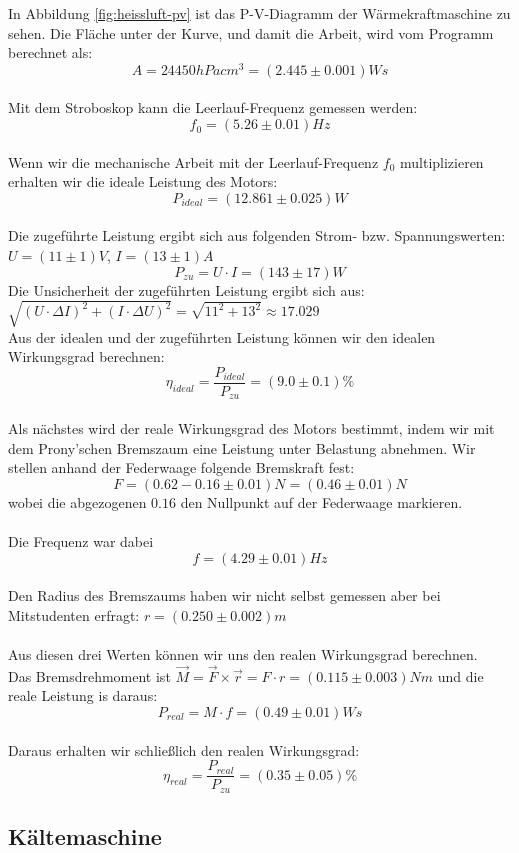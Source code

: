 \documentclass[12pt,a4paper,twopage]{article}
\begin{document}
In Abbildung \ref{fig:heissluft-pv} ist das P-V-Diagramm der Wärmekraftmaschine zu sehen. Die Fläche unter der Kurve, und damit die Arbeit, wird vom Programm berechnet als:
$$A=24450hPa cm^3 =(2.445 \pm 0.001) Ws$$
\\
Mit dem Stroboskop kann die Leerlauf-Frequenz gemessen werden:
$$f_0=(5.26 \pm 0.01)Hz$$
\\
Wenn wir die mechanische Arbeit mit der Leerlauf-Frequenz $f_0$ multiplizieren erhalten wir die ideale Leistung des Motors:
$$\boxed{P_{ideal}=(12.861 \pm 0.025)W}$$
\\
Die zugeführte Leistung ergibt sich aus folgenden Strom- bzw. Spannungswerten: 
$U=(11 \pm 1)V$, $I=(13 \pm 1)A$
$$\boxed{P_{zu}=U \cdot I = (143 \pm 17)W}$$
Die Unsicherheit der zugeführten Leistung ergibt sich aus:
$\sqrt{(U\cdot\Delta I)^2+(I\cdot\Delta U)^2}=\sqrt{11^2+13^2}\approx17.029$
\\
Aus der idealen und der zugeführten Leistung können wir den idealen Wirkungsgrad berechnen:
$$\boxed{\eta_{ideal}=\frac{P_{ideal}}{P_{zu}}=(9.0 \pm 0.1)\%}$$
\\
Als nächstes wird der reale Wirkungsgrad des Motors bestimmt, indem wir mit dem Prony'schen Bremszaum eine Leistung unter Belastung abnehmen.
Wir stellen anhand der Federwaage folgende Bremskraft fest:
$$F=(0.62-0.16 \pm 0.01)N=(0.46 \pm 0.01)N$$
wobei die abgezogenen $0.16$ den Nullpunkt auf der Federwaage markieren.\\
\\
Die Frequenz war dabei
$$f=(4.29 \pm 0.01)Hz$$
\\
Den Radius des Bremszaums haben wir nicht selbst gemessen aber bei Mitstudenten erfragt: $r=(0.250 \pm 0.002)m$\\
\\
Aus diesen drei Werten können wir uns den realen Wirkungsgrad berechnen.\\
Das Bremsdrehmoment ist $\vec{M}=\vec{F}\times \vec{r}=F\cdot r = (0.115 \pm 0.003)Nm$ und die reale Leistung is daraus:
$$\boxed{P_{real}=M\cdot f=(0.49 \pm 0.01)Ws}$$
\\
Daraus erhalten wir schließlich den realen Wirkungsgrad:
$$\boxed{\eta_{real}=\frac{P_{real}}{P_{zu}}=(0.35 \pm 0.05)\%}$$
\subsection{Kältemaschine}
\end{document}
